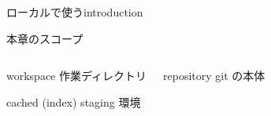 % 
% 
% 
% 

\begin{frame}[t]{ローカルで使う}{introduction}

  本章のスコープ
  \vspace{4ex}

  \begin{columns}

    \begin{narrowcolumn}
      \begin{block}{workspace}
        作業ディレクトリ
      \end{block}

      \begin{block}{cached (index)}
        staging 環境
      \end{block}
    \end{narrowcolumn}

    \begin{halfcolumn}
      \begin{block}{repository}
        git の本体
      \end{block}
    \end{halfcolumn}

  \end{columns}

\end{frame}
